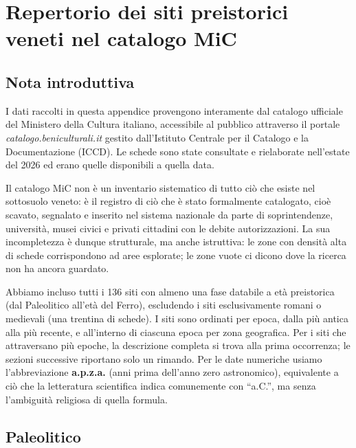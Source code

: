 
\chapter{Repertorio dei siti preistorici veneti nel catalogo MiC}
\label{cap:appendice_siti}


\section*{Nota introduttiva}

I dati raccolti in questa appendice provengono interamente dal catalogo ufficiale del Ministero della Cultura italiano, accessibile al pubblico attraverso il portale \textit{catalogo.beniculturali.it} gestito dall'Istituto Centrale per il Catalogo e la Documentazione (ICCD). Le schede sono state consultate e rielaborate nell'estate del 2026 ed erano quelle disponibili a quella data.

Il catalogo MiC non è un inventario sistematico di tutto ciò che esiste nel sottosuolo veneto: è il registro di ciò che è stato formalmente catalogato, cioè scavato, segnalato e inserito nel sistema nazionale da parte di soprintendenze, università, musei civici e privati cittadini con le debite autorizzazioni. La sua incompletezza è dunque strutturale, ma anche istruttiva: le zone con densità alta di schede corrispondono ad aree esplorate; le zone vuote ci dicono dove la ricerca non ha ancora guardato.

Abbiamo incluso tutti i 136 siti con almeno una fase databile a età preistorica (dal Paleolitico all'età del Ferro), escludendo i siti esclusivamente romani o medievali (una trentina di schede). I siti sono ordinati per epoca, dalla più antica alla più recente, e all'interno di ciascuna epoca per zona geografica. Per i siti che attraversano più epoche, la descrizione completa si trova alla prima occorrenza; le sezioni successive riportano solo un rimando. Per le date numeriche usiamo l'abbreviazione \textbf{a.p.z.a.} (anni prima dell'anno zero astronomico), equivalente a ciò che la letteratura scientifica indica comunemente con ``a.C.'', ma senza l'ambiguità religiosa di quella formula.

\section{Paleolitico}
\label{app:paleolitico}

